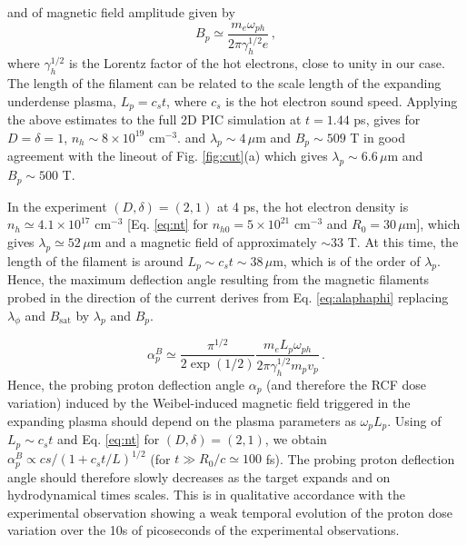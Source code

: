\documentclass[aps,showpacs,superscriptaddress]{revtex4}
\begin{document}
and of magnetic field amplitude given by 
\begin{equation}\label{eq:bp}
B_p \simeq \frac{m_e\omega_{ph}}{2\pi\gamma_h^{1/2} e}\, ,
\end{equation}
where $\gamma_h^{1/2}$ is the Lorentz factor of the hot electrons, close to unity in our case.
The length of the filament can be related to the scale length of the expanding underdense plasma, $L_p = c_{s} t$, where $c_{s}$ is the hot electron sound speed.
Applying the above estimates to the full 2D PIC simulation at $t = 1.44$ ps, gives for $D=\delta=1$, $n_h  \sim  8 \times 10^{19}$ cm$^{-3}$.
 and $\lambda_p \sim 4 \, \mu$m 
and  $B_p \sim 509$ T in good agreement with the lineout of Fig. \ref{fig:cut}(a) which gives  $\lambda_p \sim 6.6 \, \mu$m 
and  $B_p \sim 500$ T.

In the experiment $(D,\delta)=(2,1)$ at 4 ps, the hot electron density is $n_h\simeq 4.1\times 10^{17}$ cm$^{-3}$  [Eq. \eqref{eq:nt} for $n_{h0}=5\times 10^{21}$  cm$^{-3}$ and $R_0=30\, \mu$m], which gives $\lambda_p\simeq 52\, \mu$m and a magnetic field of approximately $\sim 33$ T. 
At this time, the length of the filament is around  $L_p \sim c_st \sim 38\, \mu$m, which is of the order of $\lambda_p$.
Hence, the maximum deflection angle resulting from  the magnetic filaments probed in the direction of the current derives from Eq. \eqref{eq:alaphaphi} replacing $\lambda_\phi$ and $B_\mathrm{sat}$ by $\lambda_p$ and $B_p$.

\begin{equation}
\alpha^B_p \simeq  \frac{\pi^{1/2}}{2\exp(1/2)}      \frac{m_eL_p\omega_{ph}}{2\pi\gamma_h^{1/2}m_p v_p} \, . \label{eq:alaphap}
\end{equation}
Hence, the probing proton deflection angle $\alpha_p$ (and therefore the RCF dose variation) induced by the Weibel-induced magnetic field triggered in the expanding plasma should 
depend on the plasma parameters as $\omega_pL_p$. Using of $L_p \sim c_st $ and Eq. \eqref{eq:nt} for $(D,\delta)=(2,1)$, we obtain $\alpha^B_p\propto cs/(1+c_st/L)^{1/2}$ (for $t\gg R_0/c\simeq 100$ fs). The probing proton deflection angle should therefore slowly decreases as the   target expands and on hydrodynamical times scales.
This is in qualitative accordance with the experimental observation showing a weak temporal evolution of the proton dose variation over the 10s of picoseconds of the experimental observations.
\end{document}
